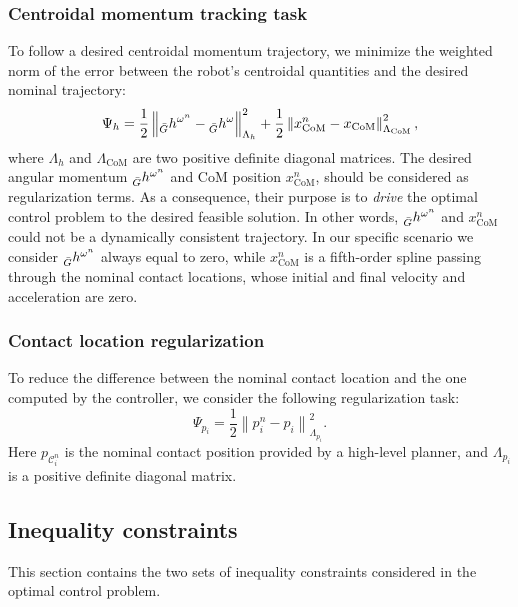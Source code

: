 \subsubsection{Centroidal momentum tracking task}
To follow a desired centroidal momentum trajectory, we minimize the weighted norm of the error between the robot's centroidal quantities and the desired nominal trajectory:
\begin{equation}
    \Psi_{h} = \frac{1}{2} \left\| \prescript{}{\bar{G}}{h}^{\omega ^n} - \prescript{}{\bar{G}}{h}^\omega \right\|^2_{\Lambda_{h}} + \frac{1}{2} \left\| x_{\text{CoM}} ^ n -x_{\text{CoM}}  \right\|^2_{\Lambda_{\text{CoM}}}, 
    \label{eq:task_centroidal}
\end{equation}
where $\Lambda_h$ and $\Lambda_{\text{CoM}}$ are two positive definite diagonal matrices. The desired angular momentum $\prescript{}{\bar{G}}{h}^{\omega ^n}$ and CoM position $x_{\text{CoM}} ^ n$, should be considered as regularization terms. As a consequence, their purpose is to \emph{drive} the optimal control problem to the desired feasible solution. In other words, $\prescript{}{\bar{G}}{h}^{\omega ^n}$ and $x_{\text{CoM}} ^ n$ could not be a dynamically consistent trajectory. In our specific scenario we consider $\prescript{}{\bar{G}}{h}^{\omega ^n}$ always equal to zero, while $ x_{\text{CoM}} ^ n$ is a fifth-order spline passing through the nominal contact locations, whose initial and final velocity and acceleration are zero. 

\subsubsection{Contact location regularization}
To reduce the difference between the nominal contact location and the one computed by the controller, we consider the following regularization task:
\begin{equation}
    \Psi_{p_{i}} = \frac{1}{2} \left\| p_{i}^n  - p_{i}  \right\|^2_{\Lambda_{p_{i}}}.
    \label{eq:task_contact}
\end{equation}
Here $p_{\mathcal{C}_i^n}$ is the nominal contact position provided by a high-level planner, and $\Lambda_{p_{i}}$ is a positive definite diagonal matrix.


\subsection{Inequality constraints\label{sec:mpc_constraints}}
This section contains the two sets of inequality constraints considered in the optimal control problem. 

